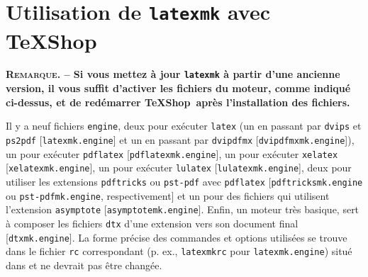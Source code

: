 \documentclass[11pt,french]{article}
\newcommand{\TS}{\textsf{\TeX Shop}}
\begin{document}
%
%


\section{Utilisation de \texttt{latexmk} avec \TS}%

\noindent\textbf{\textsc{Remarque}. -- Si vous mettez à jour \texttt{latexmk} à partir d'une ancienne version, il vous suffit d'activer les fichiers du moteur, comme indiqué ci-dessus, et de redémarrer \TS\ après l'installation des fichiers.}

Il y a neuf fichiers \texttt{engine}, deux pour exécuter \texttt{latex} (un en passant par \texttt{dvips} et \texttt{ps2pdf} [\texttt{latexmk.engine}] et un en passant par \texttt{dvipdfmx} [\texttt{dvipdfmxmk.engine}]), un pour exécuter \texttt{pdflatex} [\texttt{pdflatexmk.engine}], un pour exécuter \texttt{xelatex} [\texttt{xelatexmk.engine}], un pour exécuter \texttt{lulatex} [\texttt{lulatexmk.engine}], deux pour utiliser les extensions \texttt{pdftricks} ou \texttt{pst-pdf} avec \texttt{pdflatex} [\texttt{pdftricksmk.engine} ou \texttt{pst-pdfmk.engine}, respectivement] et un pour des fichiers qui utilisent l'extension \texttt{asymptote} [\texttt{asymptotemk.engine}]. Enfin, un moteur très basique, sert à composer les fichiers \texttt{dtx} d'une extension vers son document final [\texttt{dtxmk.engine}]. La forme précise des commandes et options utilisées se trouve dans le fichier \texttt{rc} correspondant (p. ex., \texttt{latexmkrc} pour \texttt{latexmk.engine}) situé dans  et ne devrait pas être changée.
\end{document}
